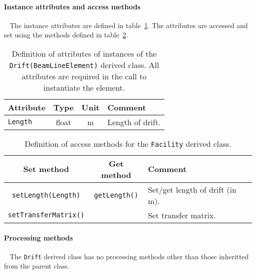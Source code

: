 \paragraph{Instance attributes and access methods} ~\newline
\label{SubSubSect:Drft:InstAttr}
\noindent
The instance attributes are defined in
table~\ref{Tab:Drft:Attributes}. 
The attributes are accessed and set using the methods defined in
table~\ref{Tab:Drft:Methods}.
\begin{table}[h]
  \caption{
    Definition of attributes of instances of
    the \texttt{Drift(BeamLineElement)} derived class.
    All attributes are required in the call to instantiate the
    element.
  }
  \label{Tab:Drft:Attributes}
  \begin{center}
    \begin{tabular}{|l|c|c|p{10cm}|}
      \hline
      \textbf{Attribute} & \textbf{Type} & \textbf{Unit} & \textbf{Comment}                                                                   \\
      \hline
      \texttt{Length} & float & m & Length of drift. \\
      \hline
    \end{tabular}
  \end{center}
\end{table}
\begin{table}[h]
  \caption{
    Definition of access methods for the \texttt{Facility} derived
    class. 
  }
  \label{Tab:Drft:Methods}
  \begin{center}
    \begin{tabular}{|c|c|p{7cm}|}
      \hline
      \textbf{Set method} & \textbf{Get method}  & \textbf{Comment}                       \\
      \hline
      \texttt{setLength(Length)}   & \texttt{getLength()} & Set/get length of drift (in m). \\
      \texttt{setTransferMatrix()} &                      & Set transfer matrix.            \\
      \hline
    \end{tabular}
  \end{center}
\end{table}

\paragraph{Processing methods} ~\newline
\noindent
The \texttt{Drift} derived class has no processing methods other
than those inheritted from the parent class.

